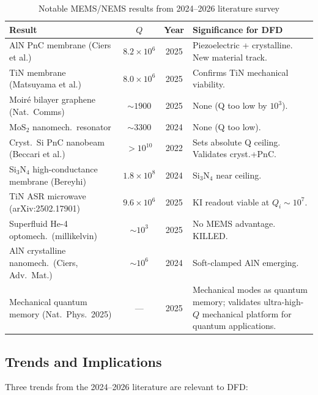 \documentclass[11pt]{article}
\theoremstyle{remark}
\newcommand{\ee}[1]{\times 10^{#1}}
\begin{document}
\begin{table}[H]
\centering
\caption{Notable MEMS/NEMS results from 2024--2026 literature survey}
\label{tab:latest}
\begin{tabular}{@{}p{4cm}ccp{4cm}@{}}
\toprule
Result & $Q$ & Year & Significance for DFD \\
\midrule
AlN PnC membrane (Ciers et al.) & $8.2\ee{6}$ & 2025 &
  Piezoelectric + crystalline. New material track. \\
TiN membrane (Matsuyama et al.) & $8.0\ee{6}$ & 2025 &
  Confirms TiN mechanical viability. \\
Moir\'e bilayer graphene (Nat.\ Comms) & $\sim 1900$ & 2025 &
  None (Q too low by $10^3$). \\
MoS$_2$ nanomech.\ resonator & $\sim 3300$ & 2024 &
  None (Q too low). \\
Cryst.\ Si PnC nanobeam (Beccari et al.) & $> 10^{10}$ & 2022 &
  Sets absolute Q ceiling. Validates cryst.+PnC. \\
Si$_3$N$_4$ high-conductance membrane (Bereyhi) & $1.8\ee{8}$ & 2024 &
  Si$_3$N$_4$ near ceiling. \\
TiN ASR microwave (arXiv:2502.17901) & $9.6\ee{6}$ & 2025 &
  KI readout viable at $Q_i \sim 10^7$. \\
Superfluid He-4 optomech.\ (millikelvin) & $\sim 10^3$ & 2025 &
  No MEMS advantage. KILLED. \\
AlN crystalline nanomech.\ (Ciers, Adv.\ Mat.) & $\sim 10^6$ & 2024 &
  Soft-clamped AlN emerging. \\
Mechanical quantum memory (Nat.\ Phys.\ 2025) & --- & 2025 &
  Mechanical modes as quantum memory; validates
  ultra-high-$Q$ mechanical platform for quantum applications. \\
\bottomrule
\end{tabular}
\end{table}

\subsection{Trends and Implications}

Three trends from the 2024--2026 literature are relevant to DFD:
\end{document}

